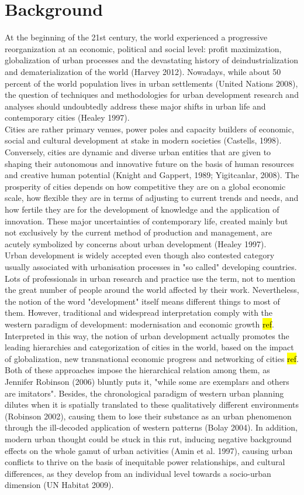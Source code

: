 \documentclass[11pt]{report}
\begin{document}
\section{Background}

At the beginning of the 21st century, the world experienced a progressive reorganization at an economic, political and social level: profit maximization, globalization of urban processes and the devastating history of deindustrialization and dematerialization of the world (Harvey 2012). Nowadays, while about 50 percent of the world population lives in urban settlements (United Nations 2008), the question of techniques and methodologies for urban development research and analyses should undoubtedly address these major shifts in urban life and contemporary cities (Healey 1997).
\\
Cities are rather primary venues, power poles and capacity builders of economic, social and cultural development at stake in modern societies (Castells, 1998). Conversely, cities are dynamic and diverse urban entities that are given to shaping their autonomous and innovative future on the basis of human resources and creative human potential (Knight and Gappert, 1989; Yigitcanlar, 2008). The prosperity of cities depends on how competitive they are on a global economic scale, how flexible they are in terms of adjusting to current trends and needs, and how fertile they are for the development of knowledge and the application of innovation. These major uncertainties of contemporary life, created mainly but not exclusively by the current method of production and management, are acutely symbolized by concerns about urban development (Healey 1997).
\\
Urban development is widely accepted even though also contested category usually associated with urbanisation processes in "so called" developing countries. Lots of professionals in urban research and practice use the term, not to mention the great number of people around the world affected by their work. Nevertheless, the notion of the word "development" itself means different things to most of them.
However, traditional and widespread interpretation comply with the western paradigm of development: modernisation and economic growth \hl{ref}. Interpreted in this way, the notion of urban development actually promotes the leading hierarchies and categorization of cities in the world, based on the impact of globalization, new transnational  economic  progress  and  networking  of  cities \hl{ref}. Both of these approaches impose the hierarchical relation among them, as Jennifer Robinson (2006) bluntly puts it, "while some are exemplars and others are imitators". Besides, the chronological paradigm of western urban planning dilutes when it is spatially translated to these qualitatively different environments (Robinson 2002), causing them to lose their substance as an urban phenomenon through the ill-decoded application of western patterns (Bolay 2004). In addition, modern urban thought could be stuck in this rut, inducing negative background effects on the whole gamut of urban activities (Amin et al. 1997), causing urban conflicts to thrive on the basis of inequitable power relationships, and cultural differences, as they develop from an individual level towards a socio-urban dimension (UN Habitat 2009).
\end{document}
